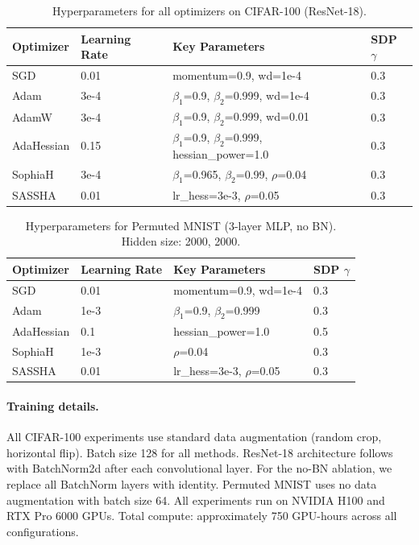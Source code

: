\documentclass{article}
\begin{document}
\begin{table}[h]
\caption{Hyperparameters for all optimizers on CIFAR-100 (ResNet-18).}
\centering
\small
\begin{tabular}{@{}llll@{}}
\toprule
\textbf{Optimizer} & \textbf{Learning Rate} & \textbf{Key Parameters} & \textbf{SDP $\gamma$} \\
\midrule
SGD & 0.01 & momentum=0.9, wd=1e-4 & 0.3 \\
Adam & 3e-4 & $\beta_1$=0.9, $\beta_2$=0.999, wd=1e-4 & 0.3 \\
AdamW & 3e-4 & $\beta_1$=0.9, $\beta_2$=0.999, wd=0.01 & 0.3 \\
AdaHessian & 0.15 & $\beta_1$=0.9, $\beta_2$=0.999, hessian\_power=1.0 & 0.3 \\
SophiaH & 3e-4 & $\beta_1$=0.965, $\beta_2$=0.99, $\rho$=0.04 & 0.3 \\
SASSHA & 0.01 & lr\_hess=3e-3, $\rho$=0.05 & 0.3 \\
\bottomrule
\end{tabular}
\end{table}

\begin{table}[h]
\caption{Hyperparameters for Permuted MNIST (3-layer MLP, no BN). Hidden size: 2000, 2000.}
\centering
\small
\begin{tabular}{@{}llll@{}}
\toprule
\textbf{Optimizer} & \textbf{Learning Rate} & \textbf{Key Parameters} & \textbf{SDP $\gamma$} \\
\midrule
SGD & 0.01 & momentum=0.9, wd=1e-4 & 0.3 \\
Adam & 1e-3 & $\beta_1$=0.9, $\beta_2$=0.999 & 0.3 \\
AdaHessian & 0.1 & hessian\_power=1.0 & 0.5 \\
SophiaH & 1e-3 & $\rho$=0.04 & 0.3 \\
SASSHA & 0.01 & lr\_hess=3e-3, $\rho$=0.05 & 0.3 \\
\bottomrule
\end{tabular}
\end{table}

\paragraph{Training details.}
All CIFAR-100 experiments use standard data augmentation (random crop, horizontal flip). Batch size 128 for all methods. ResNet-18 architecture follows~\citet{he2016deep} with BatchNorm2d after each convolutional layer. For the no-BN ablation, we replace all BatchNorm layers with identity. Permuted MNIST uses no data augmentation with batch size 64. All experiments run on NVIDIA H100 and RTX Pro 6000 GPUs. Total compute: approximately 750 GPU-hours across all configurations.
\end{document}
